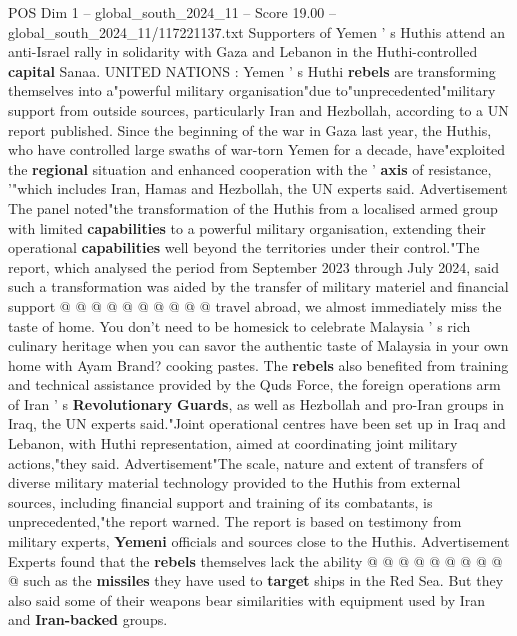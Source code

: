 \begin{textsample}{POS Dim 1 – global\_south\_2024\_11 – Score 19.00 – global\_south\_2024\_11/117221137.txt}  \label{ex:f1_pos_175}
Supporters of Yemen ' s Huthis attend an anti-Israel rally in solidarity with Gaza and Lebanon in the Huthi-controlled \textbf{capital} Sanaa.
UNITED NATIONS : Yemen ' s Huthi \textbf{rebels} are transforming themselves into a"powerful military organisation"due to"unprecedented"military support from outside sources, particularly Iran and Hezbollah, according to a UN report published.
Since the beginning of the war in Gaza last year, the Huthis, who have controlled large swaths of war-torn Yemen for a decade, have"exploited the \textbf{regional} situation and enhanced cooperation with the ' \textbf{axis} of resistance, '"which includes Iran, Hamas and Hezbollah, the UN experts said.
Advertisement The panel noted"the transformation of the Huthis from a localised armed group with limited \textbf{capabilities} to a powerful military organisation, extending their operational \textbf{capabilities} well beyond the territories under their control."The report, which analysed the period from September 2023 through July 2024, said such a transformation was aided by the transfer of military materiel and financial support @ @ @ @ @ @ @ @ @ @ travel abroad, we almost immediately miss the taste of home.
You don't need to be homesick to celebrate Malaysia ' s rich culinary heritage when you can savor the authentic taste of Malaysia in your own home with Ayam Brand? cooking pastes.
The \textbf{rebels} also benefited from training and technical assistance provided by the Quds Force, the foreign operations arm of Iran ' s \textbf{Revolutionary} \textbf{Guards}, as well as Hezbollah and pro-Iran groups in Iraq, the UN experts said."Joint operational centres have been set up in Iraq and Lebanon, with Huthi representation, aimed at coordinating joint military actions,"they said.
Advertisement"The scale, nature and extent of transfers of diverse military material technology provided to the Huthis from external sources, including financial support and training of its combatants, is unprecedented,"the report warned.
The report is based on testimony from military experts, \textbf{Yemeni} officials and sources close to the Huthis.
Advertisement Experts found that the \textbf{rebels} themselves lack the ability @ @ @ @ @ @ @ @ @ @ such as the \textbf{missiles} they have used to \textbf{target} ships in the Red Sea.
But they also said some of their weapons bear similarities with equipment used by Iran and \textbf{Iran-backed} groups.

\end{textsample}
